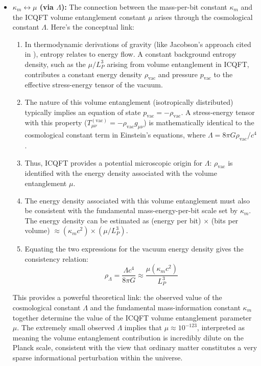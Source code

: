 \documentclass[11pt]{article}
\begin{document}
\begin{itemize}
    \item \textbf{$\kappa_m \leftrightarrow \mu$ (via $\Lambda$):} The connection between the mass-per-bit constant $\kappa_m$ and the ICQFT volume entanglement constant $\mu$ arises through the cosmological constant $\Lambda$. Here's the conceptual link:
        \begin{enumerate}
            \item In thermodynamic derivations of gravity (like Jacobson's approach cited in \cite{Chinitz2025}), entropy relates to energy flow. A constant background entropy density, such as the $\mu/L_P^3$ arising from volume entanglement in ICQFT, contributes a constant energy density $\rho_{\mathrm{vac}}$ and pressure $p_{\mathrm{vac}}$ to the effective stress-energy tensor of the vacuum.
            \item The nature of this volume entanglement (isotropically distributed) typically implies an equation of state $p_{\mathrm{vac}} = -\rho_{\mathrm{vac}}$. A stress-energy tensor with this property ($T_{\mu\nu}^{(\mathrm{vac})} = -\rho_{\mathrm{vac}} g_{\mu\nu}$) is mathematically identical to the cosmological constant term in Einstein's equations, where $\Lambda = 8\pi G \rho_{\mathrm{vac}}/c^4$.
            \item Thus, ICQFT provides a potential microscopic origin for $\Lambda$: $\rho_{\mathrm{vac}}$ is identified with the energy density associated with the volume entanglement $\mu$.
            \item The energy density associated with this volume entanglement must also be consistent with the fundamental mass-energy-per-bit scale set by $\kappa_m$. The energy density can be estimated as (energy per bit) $\times$ (bits per volume) $\approx (\kappa_m c^2) \times (\mu / L_P^3)$.
            \item Equating the two expressions for the vacuum energy density gives the consistency relation:
                $$
                \rho_\Lambda = \frac{\Lambda c^4}{8\pi G} \approx \frac{\mu (\kappa_m c^2)}{L_P^3}
                $$
        \end{enumerate}
    This provides a powerful theoretical link: the observed value of the cosmological constant $\Lambda$ and the fundamental mass-information constant $\kappa_m$ together determine the value of the ICQFT volume entanglement parameter $\mu$. The extremely small observed $\Lambda$ implies that $\mu \approx 10^{-123}$, interpreted as meaning the volume entanglement contribution is incredibly dilute on the Planck scale, consistent with the view that ordinary matter constitutes a very sparse informational perturbation within the universe.


\end{itemize}
\end{document}
